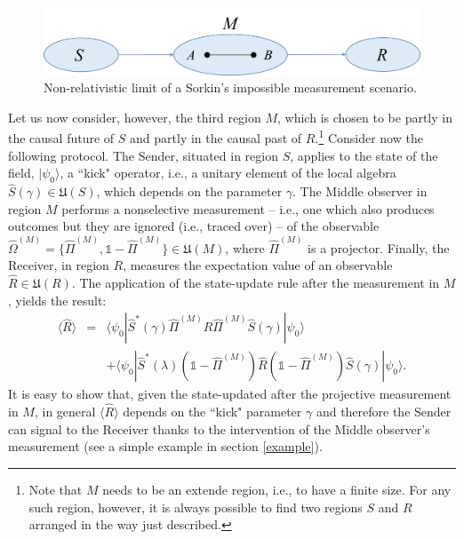 \documentclass[a4paper,twocolumn,11pt,accepted=2024-02-14]{quantumarticle}
\newcommand{\ket}[1]{| {#1} \rangle} %
\newcommand{\bra}[1]{\langle {#1} |} %
\begin{document}
 \begin{figure}[ht]
    \centering
    \includegraphics[width=.48\textwidth]{nonrela.png}
    \caption{Non-relativistic limit of a Sorkin's impossible measurement scenario.}
    \label{fig2}
\end{figure}

Let us now consider, however, the third  region $M$, which is chosen to be partly in the causal future of $S$ and partly in the causal past of $R$.\footnote{Note that $M$ needs to be an extende region, i.e., to have a finite size. For any such region, however, it is always possible to find two regions $S$ and $R$ arranged in the way just described.} 
Consider now the following protocol. The Sender, situated in region $S$, applies to the state of the field, $\ket{\psi_0}$, a ``kick" operator, i.e., a unitary element of the local algebra $\hat S(\gamma) \in \mathfrak{U}(S)$, which depends on the parameter $\gamma$. 
The Middle observer in region $M$ performs a nonselective measurement -- i.e., one which also produces outcomes but they are ignored (i.e., traced over) -- of the observable $\hat \Omega^{(M)}=\{\hat \Pi^{(M)}, \mathds{1} - \hat \Pi^{(M)}\}  \in \mathfrak{U}(M)$, where $\hat \Pi^{(M)}$ is a projector.
Finally, the Receiver, in region $R$, measures the expectation value of an observable $\hat R \in \mathfrak{U}(R)$. The application of the state-update rule after the measurement in $M$, yields the result:
\begin{eqnarray}
       \langle \hat R \rangle &=& \bra{\psi_0} \hat S^*(\gamma) \hat \Pi^{(M)} \hat R \hat \Pi^{(M)} \hat S(\gamma) \ket{\psi_0} \\
       &&+  \bra{\psi_0} \hat S^*(\lambda) (\mathds{1} - \hat \Pi^{(M)}) \hat R (\mathds{1} - \hat \Pi^{(M)}) \hat S(\gamma) \ket{\psi_0}. \nonumber
\end{eqnarray}
  It is easy to show that, given the state-updated after the projective measurement in $M$, in general $\langle \hat R \rangle$ depends on the ``kick" parameter $\gamma$ and therefore the Sender can signal to the Receiver thanks to the  intervention of the Middle observer's measurement (see a simple example in section \ref{example}).
\end{document}
